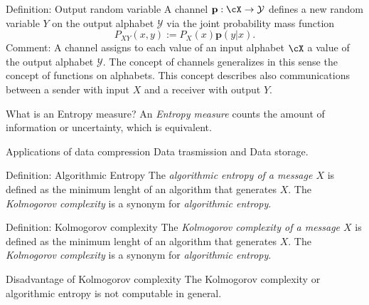 \documentclass[
			print,
			a6paper,
			grid=none]{kartei}
\begin{document}
\begin{karte}{Definition: Output random variable}
	A channel $\mathbf{p}: \cX\to\mathcal{Y}$ defines a new random variable $Y$ on the output alphabet $\mathcal{Y}$ via the joint probability mass function 
	\begin{equation*}
		P_{XY}(x,y) := P_X(x)\mathbf{p}(y\vert x).
	\end{equation*}
	Comment: A channel assigns to each value of an input alphabet $\cX$ a value of the output alphabet $\mathcal{Y}$. The concept of channels generalizes in this sense the concept of functions on alphabets. This concept describes also communications between a sender with input $X$ and a receiver with output $Y$.
\end{karte}



\begin{karte}{What is an Entropy measure?}
	An \emph{Entropy measure} counts the amount of information or uncertainty, which is equivalent.
\end{karte}

\begin{karte}{Applications of data compression}
	Data trasmission and Data storage.
\end{karte}

\begin{karte}{Definition: Algorithmic Entropy}
	The \emph{algorithmic entropy of a message $X$} is defined as the minimum lenght of an algorithm that generates $X$. The \emph{Kolmogorov complexity} is a synonym for \emph{algorithmic entropy}.
\end{karte}

\begin{karte}{Definition: Kolmogorov complexity}
	The \emph{Kolmogorov complexity of a message $X$} is defined as the minimum lenght of an algorithm that generates $X$. The \emph{Kolmogorov complexity} is a synonym for \emph{algorithmic entropy}.
\end{karte}

\begin{karte}{Disadvantage of Kolmogorov complexity}
	The Kolmogorov complexity or algorithmic entropy is not computable in general.
\end{karte}
\end{document}
